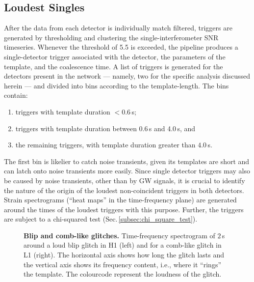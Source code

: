 \documentclass[binding=0.6cm, LaM]{sapthesis}
\begin{document}
\subsection{Loudest Singles}
	After the data from each detector is individually match filtered,
	triggers are generated by thresholding and clustering the
        single-interferometer SNR timeseries.
        Whenever the threshold of 5.5 is exceeded,
        the pipeline produces a single-detector trigger associated with the detector,
        the parameters of the template, and the coalescence time.
	A list of triggers is generated for the detectors present in the network --- namely, two for the specific analysis discussed herein --- and divided into bins according to the template-length.  The bins contain:
	\begin{enumerate}
        \item triggers with template duration $<0.6\,$s; 
        \item triggers with template duration between 0.6\,s and 4.0\,s, and
        \item the remaining triggers, with template duration greater
          than $4.0\,$s.
        \end{enumerate}
        The first bin is likelier to catch noise transients, given its templates are short and can latch onto noise transients more easily.
	Since single detector triggers may also be caused by noise transients,
	other than by GW signals, 
	it is crucial to identify the nature of the origin of the loudest non-coincident triggers in both detectors.
        Strain spectrograms (``heat maps'' in the time-frequency plane) are generated around the times of the loudest triggers with this purpose.
        Further, the triggers are subject to a chi-squared test (Sec.\,\ref{subsec:chi_square_test}).

        \begin{figure}[t]
          \noindent
          \label{glitch}
          \centering
          \caption{{\bf Blip and comb-like glitches.} Time-frequency spectrogram of $2\,$s around a loud blip glitch in H1 (left) and for a comb-like glitch in L1 (right).  The horizontal axis shows how long the glitch lasts and the vertical axis shows its frequency content, i.e., where it ``rings'' the template.  The colourcode represent the loudness of the glitch.}
          \label{fig:glitches}
        \end{figure}
\end{document}

